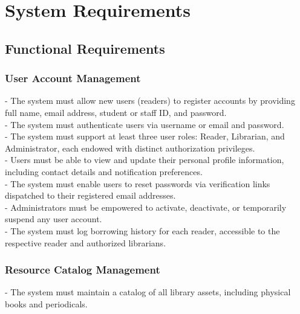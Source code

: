 \section{System Requirements}

\subsection{Functional Requirements}

\subsubsection{User Account Management}

- The system must allow new users (readers) to register accounts by providing full name, email address, student or staff ID, and password. \\

- The system must authenticate users via username or email and password. \\

- The system must support at least three user roles: Reader, Librarian, and Administrator, each endowed with distinct authorization privileges.\\

- Users must be able to view and update their personal profile information, including contact details and notification preferences.\\

- The system must enable users to reset passwords via verification links dispatched to their registered email addresses.\\

- Administrators must be empowered to activate, deactivate, or temporarily suspend any user account.\\

- The system must log borrowing history for each reader, accessible to the respective reader and authorized librarians.\\



\subsubsection{Resource Catalog Management}


- The system must maintain a catalog of all library assets, including physical books and periodicals.\\

